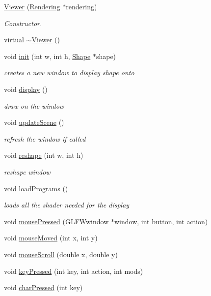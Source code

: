 \begin{DoxyCompactItemize}
\item 
\hyperlink{class_viewer_a29d3e7c2922835cbd92c285c709dbe30}{Viewer} (\hyperlink{class_rendering}{Rendering} $\ast$rendering)
\begin{DoxyCompactList}\small\item\em Constructor. \end{DoxyCompactList}\item 
virtual \hyperlink{class_viewer_a324e5a6a1532fe5eac3f3b0e4792b2da}{$\sim$\+Viewer} ()
\item 
void \hyperlink{class_viewer_a2d57e05f6d9c450431e01ffd82eb3b5e}{init} (int w, int h, \hyperlink{class_shape}{Shape} $\ast$shape)
\begin{DoxyCompactList}\small\item\em creates a new window to display shape onto \end{DoxyCompactList}\item 
void \hyperlink{class_viewer_a277a934adb86150b09d044b7cee822f8}{display} ()
\begin{DoxyCompactList}\small\item\em draw on the window \end{DoxyCompactList}\item 
void \hyperlink{class_viewer_a7deac2bd87e6c5a76c6eb600306d6096}{update\+Scene} ()
\begin{DoxyCompactList}\small\item\em refresh the window if called \end{DoxyCompactList}\item 
void \hyperlink{class_viewer_ab4e8ad8f2d8c73cc9312785e6aed9e75}{reshape} (int w, int h)
\begin{DoxyCompactList}\small\item\em reshape window \end{DoxyCompactList}\item 
void \hyperlink{class_viewer_a7afbf6081ffc5d44f4939b0d579d0b58}{load\+Programs} ()
\begin{DoxyCompactList}\small\item\em loads all the shader needed for the display \end{DoxyCompactList}\item 
void \hyperlink{class_viewer_ac2e3964b994ed24680586369b2b7a750}{mouse\+Pressed} (G\+L\+F\+Wwindow $\ast$window, int button, int action)
\item 
void \hyperlink{class_viewer_a5b0b70ce7a638a6bd3184ca4b4e73e4b}{mouse\+Moved} (int x, int y)
\item 
void \hyperlink{class_viewer_abd042d0aa5ae88ef0261d83c15ce8d4b}{mouse\+Scroll} (double x, double y)
\item 
void \hyperlink{class_viewer_a79192db7ddae958fc0ae2ee2e90cb995}{key\+Pressed} (int key, int action, int mods)
\item 
void \hyperlink{class_viewer_a12155081915ec2fcf3554534b8aa52d6}{char\+Pressed} (int key)
\end{DoxyCompactItemize}
